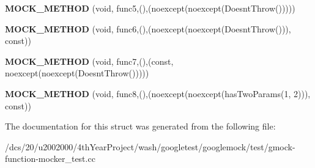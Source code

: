 \begin{DoxyCompactItemize}
{\bfseries M\+O\+C\+K\+\_\+\+M\+E\+T\+H\+OD} (void, func5,(),(noexcept(noexcept(Doesnt\+Throw()))))
\item 
\mbox{\label{structtesting_1_1gmock__function__mocker__test_1_1MockMethodNoexceptSpecifier_a9039d2776eb553ead4e8a26e2e4b72bd}} 
{\bfseries M\+O\+C\+K\+\_\+\+M\+E\+T\+H\+OD} (void, func6,(),(noexcept(noexcept(Doesnt\+Throw())), const))
\item 
\mbox{\label{structtesting_1_1gmock__function__mocker__test_1_1MockMethodNoexceptSpecifier_a25363734f70a86e3ed6deee6705e55fd}} 
{\bfseries M\+O\+C\+K\+\_\+\+M\+E\+T\+H\+OD} (void, func7,(),(const, noexcept(noexcept(Doesnt\+Throw()))))
\item 
\mbox{\label{structtesting_1_1gmock__function__mocker__test_1_1MockMethodNoexceptSpecifier_a243ea39cd7848417c0790f0e709b8d03}} 
{\bfseries M\+O\+C\+K\+\_\+\+M\+E\+T\+H\+OD} (void, func8,(),(noexcept(noexcept(has\+Two\+Params(1, 2))), const))
\end{DoxyCompactItemize}


The documentation for this struct was generated from the following file\+:\begin{DoxyCompactItemize}
\item 
/dcs/20/u2002000/4th\+Year\+Project/wash/googletest/googlemock/test/gmock-\/function-\/mocker\+\_\+test.\+cc\end{DoxyCompactItemize}
